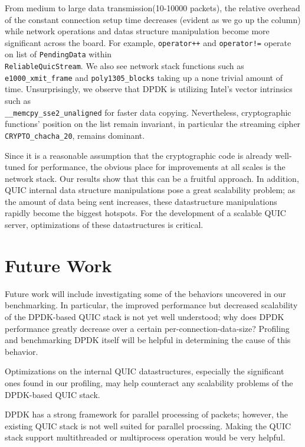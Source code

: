 \documentclass{sig-alternate-05-2015}
\begin{document}
From medium to large data transmission(10-10000 packets), the relative overhead of the constant connection setup time decreases (evident as we go up the column) while network operations and datas structure manipulation become more significant across the board. For example, \verb|operator++| and \verb|operator!=| operate on list of \verb|PendingData| within\\ \verb|ReliableQuicStream|. We also see network stack functions such as \verb|e1000_xmit_frame| and \verb|poly1305_blocks| taking up a none trivial amount of time. Unsurprisingly, we observe that DPDK is utilizing Intel's vector intrinsics such as\\ \verb|__memcpy_sse2_unaligned| for faster data copying. Nevertheless, cryptographic functions' position on the list remain invariant, in particular the streaming cipher\\ \verb|CRYPTO_chacha_20|, remains dominant. 

Since it is a reasonable assumption that the cryptographic code is already well-tuned for performance, the obvious place for improvements at all scales is the network stack. Our results show that this can be a fruitful approach. In addition, QUIC internal data structure manipulations pose a great scalability problem; as the amount of data being sent increases, these datastructure manipulations rapidly become the biggest hotspots. For the development of a scalable QUIC server, optimizations of these datastructures is critical.

\section{Future Work}

Future work will include investigating some of the behaviors uncovered in our benchmarking.
In particular, the improved performance but decreased scalability of the DPDK-based QUIC stack
is not yet well understood;
why does DPDK performance greatly decrease over a certain per-connection-data-size?
Profiling and benchmarking DPDK itself will be helpful in determining the cause of this behavior.

Optimizations on the internal QUIC datastructures,
especially the significant ones found in our profiling,
may help counteract any scalability problems of the DPDK-based QUIC stack.

DPDK has a strong framework for parallel processing of packets;
however, the existing QUIC stack is not well suited for parallel procssing.
Making the QUIC stack support multithreaded or multiprocess operation would be very helpful.
\end{document}
